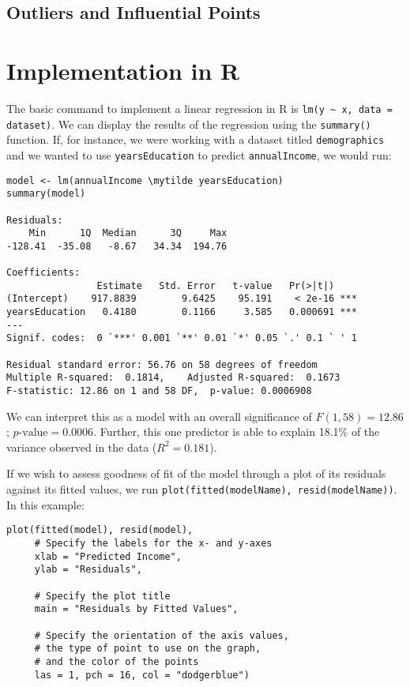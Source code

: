 \subsection{Outliers and Influential Points}



\section{Implementation in R}

The basic command to implement a linear regression in R is \verb|lm(y ~ x, data = dataset)|. We can display the results of the regression using the \verb|summary()| function. If, for instance, we were working with a dataset titled \verb|demographics| and we wanted to use \verb|yearsEducation| to predict \verb|annualIncome|, we would run:

\begin{framed}
\begin{Verbatim}[samepage=TRUE, commandchars=\\\{\}]
model <- lm(annualIncome \mytilde yearsEducation)
summary(model)

Residuals:
    Min      1Q  Median      3Q     Max 
-128.41  -35.08   -8.67   34.34  194.76 

Coefficients:
                Estimate   Std. Error   t-value   Pr(>|t|)    
(Intercept)    917.8839        9.6425    95.191    < 2e-16 ***
yearsEducation   0.4180        0.1166     3.585   0.000691 ***
---
Signif. codes:  0 `***' 0.001 `**' 0.01 `*' 0.05 `.' 0.1 ` ' 1

Residual standard error: 56.76 on 58 degrees of freedom
Multiple R-squared:  0.1814,	Adjusted R-squared:  0.1673 
F-statistic: 12.86 on 1 and 58 DF,  p-value: 0.0006908
\end{Verbatim}
\end{framed}

We can interpret this as a model with an overall significance of $F(1,58) = 12.86$; $p\text{-value}=0.0006$. Further, this one predictor is able to explain 18.1\% of the variance observed in the data ($R^2=0.181$).

If we wish to assess goodness of fit of the model through a plot of its residuals against its fitted values, we run \verb|plot(fitted(modelName), resid(modelName))|. In this example:

\begin{framed}
\begin{Verbatim}[samepage=TRUE]
plot(fitted(model), resid(model),
     # Specify the labels for the x- and y-axes
     xlab = "Predicted Income",
     ylab = "Residuals",

     # Specify the plot title
     main = "Residuals by Fitted Values",

     # Specify the orientation of the axis values,
     # the type of point to use on the graph,
     # and the color of the points
     las = 1, pch = 16, col = "dodgerblue")
\end{Verbatim}
\end{framed}

